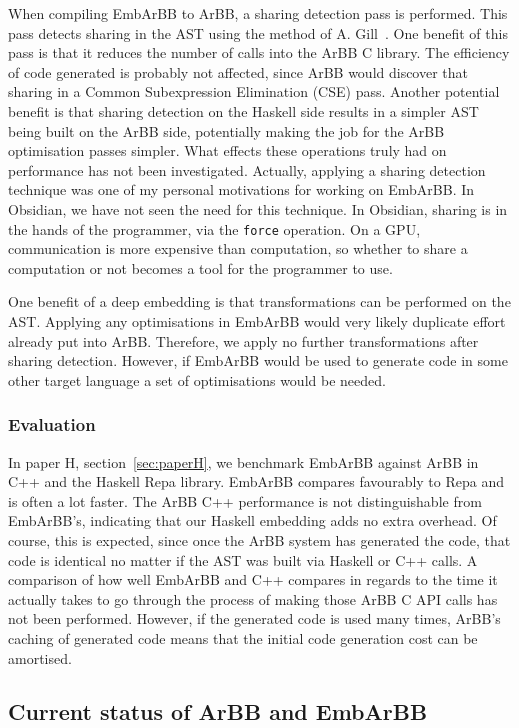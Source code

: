 \documentclass[a4paper]{book}
\begin{document}
When compiling EmbArBB to ArBB, a sharing detection pass is performed. This pass detects 
sharing in the AST using the method of A. Gill~\citet{Gill}. One benefit of this pass 
is that it reduces the number of calls into the ArBB C library. The efficiency of code 
generated is probably not affected, since ArBB would discover that sharing in a Common 
Subexpression Elimination (CSE) pass. Another potential benefit is that sharing detection 
on the Haskell side results in a simpler AST being built on the ArBB side, potentially making 
the job for the ArBB optimisation passes simpler. What effects these 
operations truly had on performance has not been investigated. Actually, applying a sharing 
detection technique was one of my personal motivations for working on EmbArBB. In Obsidian, 
we have not seen the need for this technique. In Obsidian, sharing is in the hands of the 
programmer, via the {\tt force} operation. On a GPU, communication is more expensive than 
computation, so whether to share a computation or not becomes a tool for the programmer to use. 

One benefit of a deep embedding is that transformations can be performed on the AST. Applying 
any optimisations in EmbArBB would very likely duplicate effort already put into ArBB. 
Therefore, we apply no further transformations after sharing detection. However, if EmbArBB 
would be used to generate code in some other target language a set of optimisations 
would be needed.  

\subsubsection{Evaluation} 

In paper H, section~\ref{sec:paperH}, we benchmark EmbArBB against ArBB in C++ and the Haskell 
Repa library. EmbArBB compares favourably to Repa and is often a lot faster. The ArBB 
C++ performance is not distinguishable from EmbArBB's, indicating that our Haskell embedding 
adds no extra overhead. Of course, this is expected, since once the ArBB system has generated 
the code, that code is identical no matter if the AST was built via Haskell or C++ calls. 
A comparison of how well EmbArBB and C++ compares in regards to the time it actually 
takes to go through the process of making those ArBB C API calls has not been performed. 
However, if the generated code is used many times, ArBB's caching of generated code means 
that the initial code generation cost can be amortised. 

\subsection{Current status of ArBB and EmbArBB} 
\end{document}
